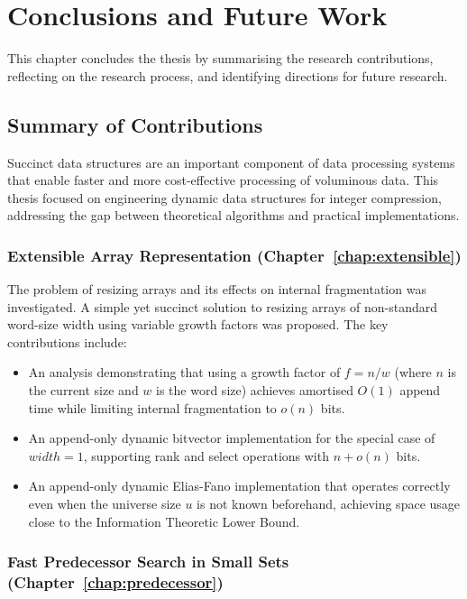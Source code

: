 \chapter{Conclusions and Future Work}
\label{chap:conclusion}

This chapter concludes the thesis by summarising the research contributions, reflecting on the research process, and identifying directions for future research.

\section{Summary of Contributions}

Succinct data structures are an important component of data processing systems that enable faster and more cost-effective processing of voluminous data. This thesis focused on engineering dynamic data structures for integer compression, addressing the gap between theoretical algorithms and practical implementations.

\subsection{Extensible Array Representation (Chapter~\ref{chap:extensible})}

The problem of resizing arrays and its effects on internal fragmentation was investigated. A simple yet succinct solution to resizing arrays of non-standard word-size width using variable growth factors was proposed. The key contributions include:

\begin{itemize}
    \item An analysis demonstrating that using a growth factor of $f = n/w$ (where $n$ is the current size and $w$ is the word size) achieves amortised $O(1)$ append time while limiting internal fragmentation to $o(n)$ bits.

    \item An append-only dynamic bitvector implementation for the special case of $width=1$, supporting rank and select operations with $n + o(n)$ bits.

    \item An append-only dynamic Elias-Fano implementation that operates correctly even when the universe size $u$ is not known beforehand, achieving space usage close to the Information Theoretic Lower Bound.
\end{itemize}

\subsection{Fast Predecessor Search in Small Sets (Chapter~\ref{chap:predecessor})}

